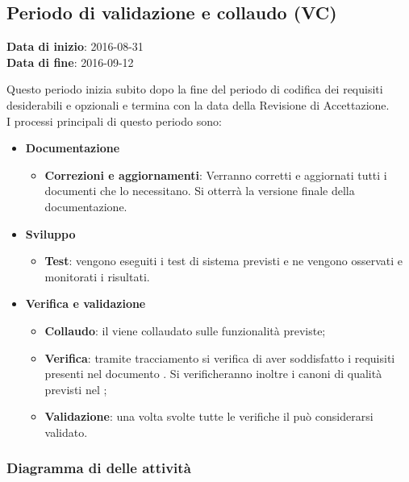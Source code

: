 	\subsection{Periodo di validazione e collaudo (VC)}
	\begin{center}
		\textbf{Data di inizio}: 2016-08-31 \\
		\textbf{Data di fine}: 2016-09-12 \\
	\end{center}
	Questo periodo inizia subito dopo la fine del periodo di codifica dei requisiti desiderabili e opzionali e termina con la data della Revisione di Accettazione. \\
	I processi principali di questo periodo sono:
		\begin{itemize}
			\item \textbf{Documentazione}
			\att
			\begin{itemize}
				\item \textbf{Correzioni e aggiornamenti}: Verranno corretti e aggiornati tutti i documenti che lo necessitano. Si otterrà la versione finale della documentazione. 
			\end{itemize}
			\item \textbf{Sviluppo}
			\att
				\begin{itemize}
					\item \textbf{Test}: vengono eseguiti i test di sistema previsti e ne vengono osservati e monitorati i risultati. 
				\end{itemize}
			\item \textbf{Verifica e validazione}
			\att
			\begin{itemize}
				\item \textbf{Collaudo}: il  viene collaudato sulle funzionalità previste;
				\item \textbf{Verifica}: tramite tracciamento si verifica di aver soddisfatto i requisiti presenti nel documento \ARdocRA. Si verificheranno inoltre i canoni di qualità previsti nel \PQdocRA;
				\item \textbf{Validazione}: una volta svolte tutte le verifiche il  può considerarsi validato.
			\end{itemize}
		\end{itemize}
		\subsubsection{Diagramma di  delle attività}
		

